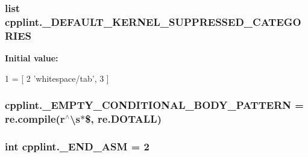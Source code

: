 \subsubsection[{\texorpdfstring{\+\_\+\+D\+E\+F\+A\+U\+L\+T\+\_\+\+K\+E\+R\+N\+E\+L\+\_\+\+S\+U\+P\+P\+R\+E\+S\+S\+E\+D\+\_\+\+C\+A\+T\+E\+G\+O\+R\+I\+ES}{_DEFAULT_KERNEL_SUPPRESSED_CATEGORIES}}]{\setlength{\rightskip}{0pt plus 5cm}list cpplint.\+\_\+\+D\+E\+F\+A\+U\+L\+T\+\_\+\+K\+E\+R\+N\+E\+L\+\_\+\+S\+U\+P\+P\+R\+E\+S\+S\+E\+D\+\_\+\+C\+A\+T\+E\+G\+O\+R\+I\+ES\hspace{0.3cm}{\ttfamily [private]}}\hypertarget{namespacecpplint_aa91fc7f951bf23aa73c820508ca6ff7d}{}\label{namespacecpplint_aa91fc7f951bf23aa73c820508ca6ff7d}
{\bfseries Initial value\+:}
\begin{DoxyCode}
1 = [
2     \textcolor{stringliteral}{'whitespace/tab'},
3     ]
\end{DoxyCode}
\subsubsection[{\texorpdfstring{\+\_\+\+E\+M\+P\+T\+Y\+\_\+\+C\+O\+N\+D\+I\+T\+I\+O\+N\+A\+L\+\_\+\+B\+O\+D\+Y\+\_\+\+P\+A\+T\+T\+E\+RN}{_EMPTY_CONDITIONAL_BODY_PATTERN}}]{\setlength{\rightskip}{0pt plus 5cm}cpplint.\+\_\+\+E\+M\+P\+T\+Y\+\_\+\+C\+O\+N\+D\+I\+T\+I\+O\+N\+A\+L\+\_\+\+B\+O\+D\+Y\+\_\+\+P\+A\+T\+T\+E\+RN = re.\+compile(r\textquotesingle{}$^\wedge$\textbackslash{}s$\ast$\$\textquotesingle{}, re.\+D\+O\+T\+A\+LL)\hspace{0.3cm}{\ttfamily [private]}}\hypertarget{namespacecpplint_a8cd8b98aa00e581d653067079f82c7ab}{}\label{namespacecpplint_a8cd8b98aa00e581d653067079f82c7ab}
\subsubsection[{\texorpdfstring{\+\_\+\+E\+N\+D\+\_\+\+A\+SM}{_END_ASM}}]{\setlength{\rightskip}{0pt plus 5cm}int cpplint.\+\_\+\+E\+N\+D\+\_\+\+A\+SM = 2\hspace{0.3cm}{\ttfamily [private]}}\hypertarget{namespacecpplint_a6b53db7569ac305c328d95092cf45f1a}{}\label{namespacecpplint_a6b53db7569ac305c328d95092cf45f1a}
